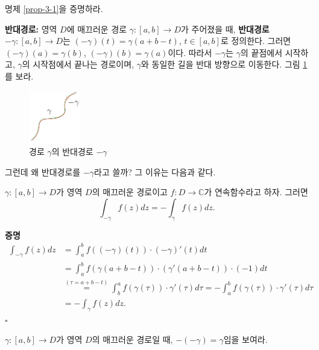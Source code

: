 \begin{salt_exercise} \label{ex-3-6}
명제 \ref{prop-3-1}을 증명하라.
\end{salt_exercise}

{\bf 반대경로:}
영역 $D$에 매끄러운 경로 $\gamma: [a,b] \to D$가 
주어졌을 때, {\bf 반대경로} $-\gamma: [a,b] \to D$는
$(-\gamma)(t) = \gamma(a+b-t)$, $t\in[a,b]$로 정의한다.
그러면 $(-\gamma)(a) = \gamma(b)$, $(-\gamma)(b) = \gamma(a)$이다.
따라서 $-\gamma$는 $\gamma$의 끝점에서 시작하고,
$\gamma$의 시작점에서 끝나는 경로이며,
$\gamma$와 동일한 길을 반대 방향으로 이동한다.
그림 \ref{fig-3-9}를 보라.
\begin{figure}[!h]
\begin{center}
\includegraphics[width=0.2\textwidth]{./SaltChapter/figs/fig-3-9}
\end{center}
\caption{경로 $\gamma$의 반대경로 $-\gamma$}
\label{fig-3-9}
\end{figure}

그런데 왜 반대경로를 $-\gamma$라고 쓸까?
그 이유는 다음과 같다.

\begin{saltprop}{}{} \label{prop-3-2}
$\gamma: [a,b] \to D$가 영역 $D$의 매끄러운 경로이고
$f:D\to\mathbb C$가 연속함수라고 하자. 그러면
\[
\int_{-\gamma} f(z)dz = - \int_\gamma f(z)dz.
\]
\end{saltprop}


{\bf 증명}
\begin{align*}
\int_{-\gamma} f(z)dz
&= \int_a^b f((-\gamma)(t))\cdot (-\gamma)'(t)dt \\
&= \int_a^b f(\gamma(a+b-t))\cdot (\gamma'(a+b-t))\cdot(-1)dt \\
& \stackrel{(\tau=a+b-t)}=
\int_b^a f(\gamma(\tau))\cdot \gamma'(\tau)d\tau 
= - \int_a^b f(\gamma(\tau))\cdot \gamma'(\tau)d\tau \\
&= - \int_\gamma f(z)dz.
\end{align*}
\hfill $\square$

\begin{salt_exercise} \label{ex-3-7}
$\gamma: [a,b] \to D$가 영역 $D$의 매끄러운 경로일 때,
$-(-\gamma) = \gamma$임을 보여라.
\end{salt_exercise}

